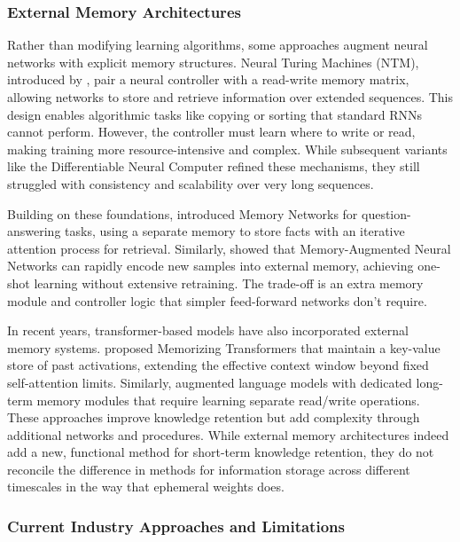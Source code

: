 \documentclass[conference]{IEEEtran}
\begin{document}
\subsubsection{External Memory Architectures}

Rather than modifying learning algorithms, some approaches augment neural networks with explicit memory structures. Neural Turing Machines (NTM), introduced by \cite{Graves2014NeuralTM}, pair a neural controller with a read-write memory matrix, allowing networks to store and retrieve information over extended sequences. This design enables algorithmic tasks like copying or sorting that standard RNNs cannot perform. However, the controller must learn where to write or read, making training more resource-intensive and complex. While subsequent variants like the Differentiable Neural Computer refined these mechanisms, they still struggled with consistency and scalability over very long sequences.

Building on these foundations, \cite{westonMemoryNetworks2014} introduced Memory Networks for question-answering tasks, using a separate memory to store facts with an iterative attention process for retrieval. Similarly, \cite{santoroMetaLearningMemoryAugmentedNeural2016} showed that Memory-Augmented Neural Networks can rapidly encode new samples into external memory, achieving one-shot learning without extensive retraining. The trade-off is an extra memory module and controller logic that simpler feed-forward networks don't require.

In recent years, transformer-based models have also incorporated external memory systems. \cite{wuMemorizingTransformers2022} proposed Memorizing Transformers that maintain a key-value store of past activations, extending the effective context window beyond fixed self-attention limits. Similarly, \cite{wangAugmentingLanguageModels2023} augmented language models with dedicated long-term memory modules that require learning separate read/write operations. These approaches improve knowledge retention but add complexity through additional networks and procedures. While external memory architectures indeed add a new, functional method for short-term knowledge retention, they do not reconcile the difference in methods for information storage across different timescales in the way that ephemeral weights does.

\subsubsection{Current Industry Approaches and Limitations}
\end{document}
